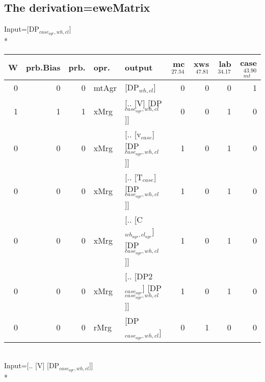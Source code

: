 \subsection{The derivation=eweMatrix}
\begingroup\scriptsize Input=[DP$_{case_{agr},wh,cl}$]\\*
\begin{tabularx}{\linewidth}{rrrlXrrrr}
\hline
   W &   prb.Bias &   prb. & opr.    & output                                     &   mc$^{27.54}$ &   xws$^{47.81}$ &   lab$^{34.17}$ &   case$_{mt}^{43.90}$ \\
\hline
   0 &       0 &   0 & mtAgr & [DP$_{wh,cl}$]                                 &            0 &             0 &             0 &                 1 \\
   1 &       1 &   1 & xMrg  & [.. [V] [DP$_{case_{agr},wh,cl}$]]               &            0 &             0 &             1 &                 0 \\
   0 &       0 &   0 & xMrg  & [.. [v$_{case}$] [DP$_{case_{agr},wh,cl}$]]          &            1 &             0 &             1 &                 0 \\
   0 &       0 &   0 & xMrg  & [.. [T$_{case}$] [DP$_{case_{agr},wh,cl}$]]          &            1 &             0 &             1 &                 0 \\
   0 &       0 &   0 & xMrg  & [.. [C$_{wh_{agr},cl_{agr}}$] [DP$_{case_{agr},wh,cl}$]] &            1 &             0 &             1 &                 0 \\
   0 &       0 &   0 & xMrg  & [.. [DP2$_{case_{agr}}$] [DP$_{case_{agr},wh,cl}$]]    &            1 &             0 &             1 &                 0 \\
   0 &       0 &   0 & rMrg  & [DP$_{case_{agr},wh,cl}$]                        &            0 &             1 &             0 &                 0 \\
\hline
\end{tabularx}\endgroup\\
\begingroup\scriptsize Input=[.. [V] [DP$_{case_{agr},wh,cl}$]]\\*
